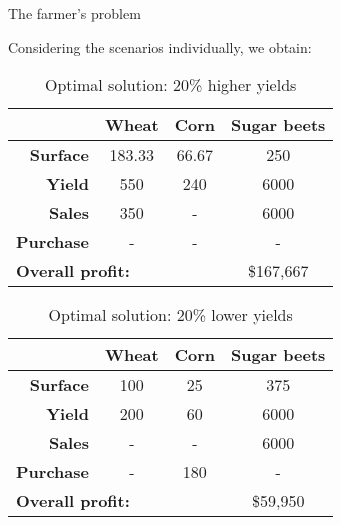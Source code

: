 \begin{frame}{The farmer's problem {\small \cite{birge2011introduction}}}
	
	Considering the scenarios individually, we obtain:
	\vspace{-6pt}
	{\small
	\begin{table}
		\begin{tabular}{rccc}
					 & \bf Wheat  & \bf Corn & \bf Sugar beets \\ \hline
			\bf Surface	 & 183.33 & 66.67 & 250    	  \\
			\bf Yield	 & 550    & 240   & 6000     \\
			\bf Sales    & 350    & -     & 6000     \\  
			\bf Purchase & -      & -     & -        \\ \hline
			\multicolumn{3}{l}{\bf Overall profit:} & \$167,667  \\ \hline 
		\end{tabular}
		\caption{Optimal solution: \alert{20\% higher yields}}
	\end{table}
	\vspace{-9pt}
	\pause
	\begin{table}
		\begin{tabular}{rccc}
					 & \bf Wheat & \bf Corn & \bf Sugar beets \\ \hline
			\bf Surface	 & 100    & 25    & 375    	  \\
			\bf Yield	 & 200    & 60    & 6000     \\
			\bf Sales    & -      & -     & 6000     \\  
			\bf Purchase & -      & 180   & -        \\ \hline
			\multicolumn{3}{l}{\bf Overall profit:} & \$59,950  \\ \hline 
		\end{tabular}
		\caption{Optimal solution: \alert{20\% lower yields}}
	\end{table}
	}

\end{frame}


